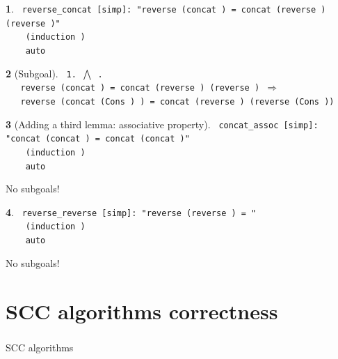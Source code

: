 \documentclass{beamer}
\newcommand{\apply}{{\color{isa_red}{apply}}}
\newcommand{\thm}{{\color{isa_blue}{theorem}}}
\newcommand{\lm}{{\color{isa_blue}{lemma}}}
\newcommand{\isa}[1]{\texttt{#1}}
\newcommand{\blue}[1]{{\color{isa_dark_blue}{#1}}}
\newcommand{\green}[1]{{\color{isa_dark_green}{#1}}}
\theoremstyle{definition}
\newtheorem*{isabelle}{}
\begin{document}
\begin{frame}
  \begin{isabelle}
    \isa{
      \lm{} reverse\_concat [simp]: "reverse (concat \blue{xs ys}) = concat (reverse \blue{ys}) (reverse \blue{xs})"\\
      ~~~\apply{} (induction \blue{xs})\\
      ~~~\apply{} auto
    }
  \end{isabelle}
  \begin{isabelle}[Subgoal]
    \footnotesize{
    \isa{
      1. $\bigwedge$ \green{x1 xs}.\\
          ~~~reverse (concat \green{xs} \blue{ys}) = concat (reverse \blue{ys}) (reverse \green{xs}) $\Longrightarrow$\\
          ~~~reverse (concat (Cons \green{x1 xs}) \blue{ys}) = concat (reverse \blue{ys}) (reverse (Cons \green{x1 xs}))
    }
    }
  \end{isabelle}
\end{frame}

\begin{frame}
  \begin{isabelle}[Adding a third lemma: associative property]
    \isa{
      \lm{} concat\_assoc [simp]: "concat (concat \blue{xs ys}) \blue{zs} = concat \blue{xs} (concat \blue{ys zs})"\\
      ~~~\apply{} (induction \blue{xs})\\
      ~~~\apply{} auto
    }
  \end{isabelle}
  No subgoals!
\end{frame}

\begin{frame}
  \begin{isabelle}
    \isa{
      \thm{} reverse\_reverse [simp]: "reverse (reverse \blue{x}) = \blue{x}"\\
      ~~~\apply{} (induction \blue{x})\\
      ~~~\apply{} auto\\
    }
  \end{isabelle}
  No subgoals!
\end{frame}

\section{SCC algorithms correctness}
\begin{frame}
  \frametitle{}
  \centering
  SCC algorithms
\end{frame}
\end{document}
